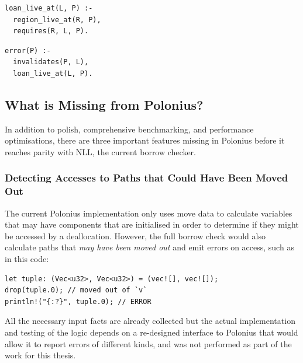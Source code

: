 \documentclass[11pt,a4paper,twoside,openany]{report}
\newenvironment{sourcecode}{\captionsetup{type=listing}}{}
\begin{document}
\begin{sourcecode}
  \label{lst:loan-live}
\begin{verbatim}
loan_live_at(L, P) :-
  region_live_at(R, P),
  requires(R, L, P).
\end{verbatim}
\end{sourcecode}

\begin{sourcecode}
  \label{lst:error-invalidates}
\begin{verbatim}
error(P) :-
  invalidates(P, L),
  loan_live_at(L, P).
\end{verbatim}
\end{sourcecode}

\subsection{What is Missing from Polonius?}\label{sec:missing-features}

In addition to polish, comprehensive benchmarking, and performance
optimisations, there are three important features missing in Polonius before it
reaches parity with NLL, the current borrow checker.

\subsubsection{Detecting Accesses to Paths that Could Have Been Moved Out}
\label{sec:missing-features:move}

The current Polonius implementation only uses move data to calculate variables
that may have components that are initialised in order to determine if they
might be accessed by a deallocation. However, the full borrow check would also
calculate paths that \emph{may have been moved out} and emit errors on access,
such as in this code:
\begin{verbatim}
let tuple: (Vec<u32>, Vec<u32>) = (vec![], vec![]);
drop(tuple.0); // moved out of `v`
println!("{:?}", tuple.0); // ERROR
\end{verbatim}

All the necessary input facts are already collected but the actual
implementation and testing of the logic depends on a re-designed interface to
Polonius that would allow it to report errors of different kinds, and was not
performed as part of the work for this thesis.
\end{document}
